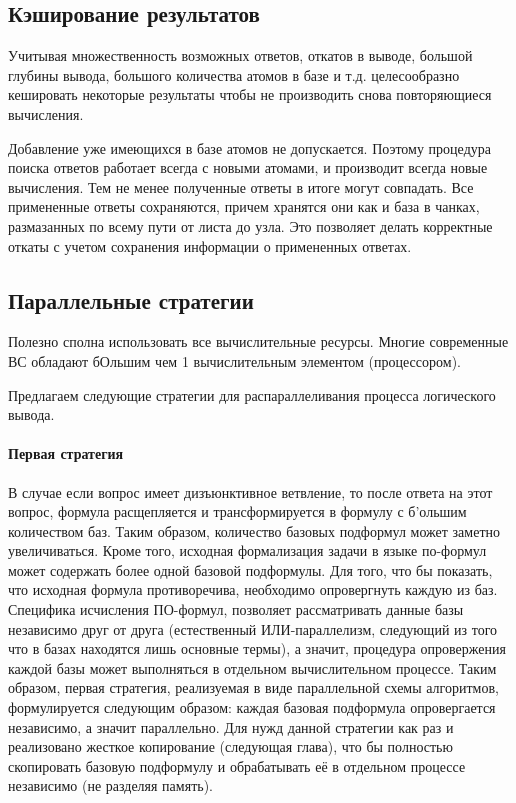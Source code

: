 \subsection{Кэширование результатов}
Учитывая множественность возможных ответов, откатов в выводе, большой глубины вывода, большого количества атомов в базе и т.д. целесообразно кешировать некоторые результаты чтобы не производить снова повторяющиеся вычисления.

Добавление уже имеющихся в базе атомов не допускается. Поэтому процедура поиска ответов работает всегда с новыми атомами, и производит всегда новые вычисления. Тем не менее полученные ответы в итоге могут совпадать. Все примененные ответы сохраняются, причем хранятся они как и база в чанках, размазанных по всему пути от листа до узла. Это позволяет делать корректные откаты с учетом сохранения информации о примененных ответах.

\subsection{Параллельные стратегии}

Полезно сполна использовать все вычислительные ресурсы. Многие современные ВС обладают бОльшим чем 1 вычислительным элементом (процессором).

Предлагаем следующие стратегии для распараллеливания процесса логического вывода.

\paragraph{Первая стратегия}

В случае если вопрос имеет дизъюнктивное ветвление, то после ответа на этот вопрос, формула расщепляется и трансформируется в формулу с б'ольшим количеством баз. Таким образом, количество базовых подформул может заметно увеличиваться. Кроме того, исходная формализация задачи в языке по-формул может содержать более одной базовой подформулы. Для того, что бы показать, что исходная формула противоречива, необходимо опровергнуть каждую из баз. Специфика исчисления ПО-формул, позволяет рассматривать данные базы независимо друг от друга (естественный ИЛИ-параллелизм, следующий из того что в базах находятся лишь основные термы), а значит, процедура опровержения каждой базы может выполняться в отдельном вычислительном процессе. Таким образом, первая стратегия, реализуемая в виде параллельной схемы алгоритмов, формулируется следующим образом: каждая базовая подформула опровергается независимо, а значит параллельно. Для нужд данной стратегии как раз и реализовано жесткое копирование (следующая глава), что бы полностью скопировать базовую подформулу и обрабатывать её в отдельном процессе независимо (не разделяя память).

